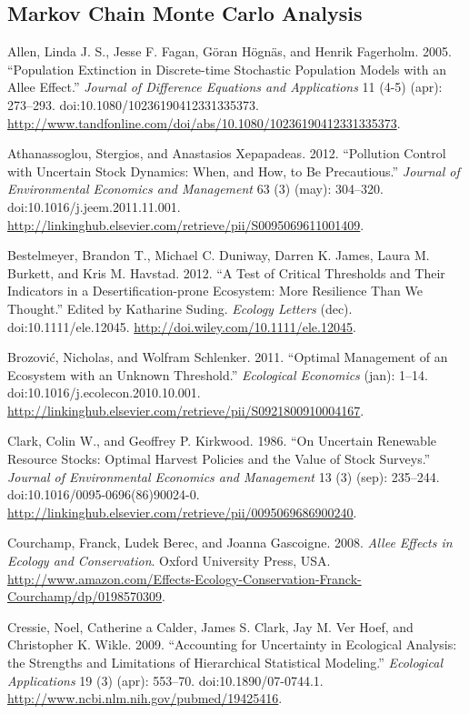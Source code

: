 \documentclass[author-year, review]{elsarticle} %
\begin{document}
\subsection{Markov Chain Monte Carlo
Analysis}\label{markov-chain-monte-carlo-analysis}

Allen, Linda J. S., Jesse F. Fagan, Göran Högnäs, and Henrik Fagerholm.
2005. ``Population Extinction in Discrete-time Stochastic Population
Models with an Allee Effect.'' \emph{Journal of Difference Equations and
Applications} 11 (4-5) (apr): 273--293.
doi:10.1080/10236190412331335373.
\url{http://www.tandfonline.com/doi/abs/10.1080/10236190412331335373}.

Athanassoglou, Stergios, and Anastasios Xepapadeas. 2012. ``Pollution
Control with Uncertain Stock Dynamics: When, and How, to Be
Precautious.'' \emph{Journal of Environmental Economics and Management}
63 (3) (may): 304--320. doi:10.1016/j.jeem.2011.11.001.
\url{http://linkinghub.elsevier.com/retrieve/pii/S0095069611001409}.

Bestelmeyer, Brandon T., Michael C. Duniway, Darren K. James, Laura M.
Burkett, and Kris M. Havstad. 2012. ``A Test of Critical Thresholds and
Their Indicators in a Desertification-prone Ecosystem: More Resilience
Than We Thought.'' Edited by Katharine Suding. \emph{Ecology Letters}
(dec). doi:10.1111/ele.12045.
\url{http://doi.wiley.com/10.1111/ele.12045}.

Brozović, Nicholas, and Wolfram Schlenker. 2011. ``Optimal Management of
an Ecosystem with an Unknown Threshold.'' \emph{Ecological Economics}
(jan): 1--14. doi:10.1016/j.ecolecon.2010.10.001.
\url{http://linkinghub.elsevier.com/retrieve/pii/S0921800910004167}.

Clark, Colin W., and Geoffrey P. Kirkwood. 1986. ``On Uncertain
Renewable Resource Stocks: Optimal Harvest Policies and the Value of
Stock Surveys.'' \emph{Journal of Environmental Economics and
Management} 13 (3) (sep): 235--244. doi:10.1016/0095-0696(86)90024-0.
\url{http://linkinghub.elsevier.com/retrieve/pii/0095069686900240}.

Courchamp, Franck, Ludek Berec, and Joanna Gascoigne. 2008. \emph{Allee
Effects in Ecology and Conservation}. Oxford University Press, USA.
\url{http://www.amazon.com/Effects-Ecology-Conservation-Franck-Courchamp/dp/0198570309}.

Cressie, Noel, Catherine a Calder, James S. Clark, Jay M. Ver Hoef, and
Christopher K. Wikle. 2009. ``Accounting for Uncertainty in Ecological
Analysis: the Strengths and Limitations of Hierarchical Statistical
Modeling.'' \emph{Ecological Applications} 19 (3) (apr): 553--70.
doi:10.1890/07-0744.1.
\url{http://www.ncbi.nlm.nih.gov/pubmed/19425416}.
\end{document}
